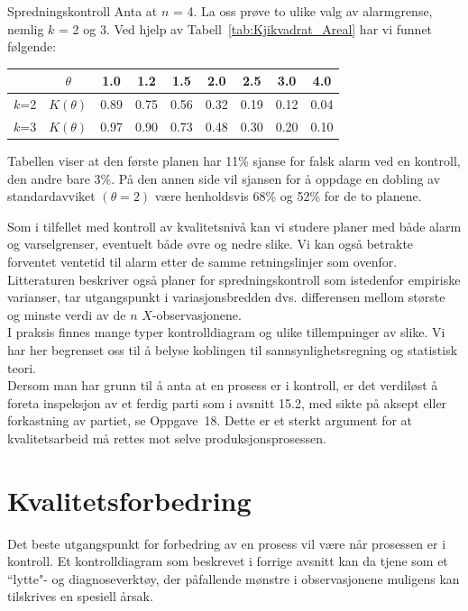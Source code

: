 \begin{eksempel}{Spredningskontroll}
Anta at $n$ = 4.  La oss prøve to ulike valg av alarmgrense, nemlig
$k$ = 2 og 3.  Ved hjelp av Tabell~\ref{tab:Kjikvadrat_Areal} har vi funnet følgende:

\begin{center}
\begin{tabular}{|c|cccccccc|} \hline
   & $\theta$ &  1.0  &  1.2  &  1.5  &  2.0  &  2.5  &  3.0  &  4.0 \\ \hline
$k$=2&$K(\theta )$ & 0.89 & 0.75 & 0.56 & 0.32 & 0.19 & 0.12 & 0.04 \\
$k$=3&$K(\theta )$ & 0.97 & 0.90 & 0.73 & 0.48 & 0.30 & 0.20 & 0.10 \\ \hline
\end{tabular}
\end{center}
Tabellen viser at den første planen har 11\% sjanse for falsk 
alarm ved en kontroll, den andre bare 3\%.  På den annen side vil
sjansen for å oppdage en dobling av standardavviket $(\theta = 2)$
være henholdsvis 68\% og 52\% for de to planene.\\
\end{eksempel}

Som i tilfellet med kontroll av kvalitetsnivå kan vi studere 
planer med både alarm og varselgrenser, eventuelt både øvre
og nedre slike.  Vi kan også betrakte forventet ventetid til
alarm etter de samme retningslinjer som ovenfor.  Litteraturen beskriver
også planer for spredningskontroll som istedenfor
empiriske varianser, tar utgangspunkt i variasjonsbredden dvs.
differensen mellom største og minste verdi av de $n$ $X$-observasjonene.\\

I praksis finnes mange typer kontrolldiagram og ulike tillempninger av slike.
Vi har her begrenset oss til å belyse koblingen til
sannsynlighetsregning og statistisk teori.\\[0.2cm]

 Dersom man har grunn til å anta at en prosess
er i kontroll, er det verdiløst å foreta inspeksjon av et ferdig
parti som i avsnitt 15.2, med sikte på aksept eller forkastning av partiet,
se Oppgave~18. Dette er et sterkt argument for at kvalitetsarbeid må
rettes mot selve produksjonsprosessen.

\section{Kvalitetsforbedring}
Det beste utgangspunkt for forbedring av en prosess vil være når
prosessen er i kontroll.
Et kontrolldiagram som beskrevet i forrige avsnitt kan da tjene som et
``lytte"- og diagnoseverktøy, der påfallende mønstre i
observasjonene muligens kan tilskrives en spesiell årsak.

